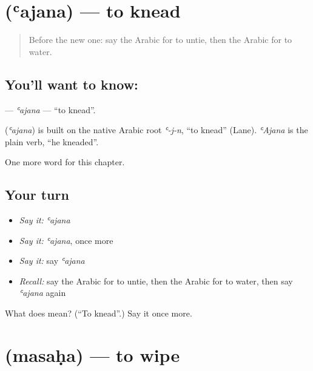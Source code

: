 \section[\texorpdfstring{\ar{عجن} (ʿajana)}{عجن (ʿajana)}]{ (ʿajana) — to knead}

\label{lesson:AR-C229-ajana}



\begin{quote}
Before the new one: say the Arabic for to untie, then the Arabic for to water.
\end{quote}

\subsection*{You'll want to know: }
\textbf{} — \emph{ʿajana} — \textquotedblleft{}to knead\textquotedblright{}.

\begin{cousinweb}
\textbf{} (\emph{ʿajana}) is built on the native Arabic root \emph{ʿ-j-n}, \textquotedblleft{}to knead\textquotedblright{} (Lane). \emph{ʿAjana} is the plain verb, \textquotedblleft{}he kneaded\textquotedblright{}.
\end{cousinweb}

\begin{grammarlens}[title={What you've built}]
One more word for this chapter.
\end{grammarlens}

\subsection*{Your turn}
\begin{itemize}
\raggedright
  \item \emph{Say it:} \emph{ʿajana}
  \item \emph{Say it:} \emph{ʿajana}, once more
  \item \emph{Say it:} say \emph{ʿajana}
  \item \emph{Recall:} say the Arabic for to untie, then the Arabic for to water, then say \emph{ʿajana} again
\end{itemize}

\begin{tcolorbox}[breakable,colback=teal!4,colframe=teal!35!black,title={Before you move on}]
What does  mean? (\textquotedblleft{}To knead\textquotedblright{}.) Say it once more.
\end{tcolorbox}
\section[\texorpdfstring{\ar{مسح} (masaḥa)}{مسح (masaḥa)}]{ (masaḥa) — to wipe}

